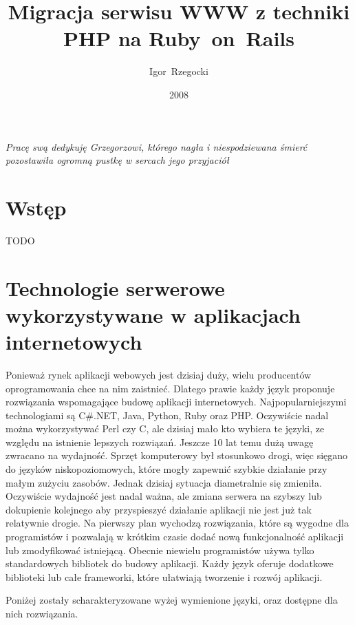 \documentclass[a4paper,12pt,oneside]{report}
\author{Igor~Rzegocki}
\title{Migracja serwisu WWW z techniki PHP na Ruby~on~Rails}
\date{2008}
\begin{document}
\maketitle

\thispagestyle{empty}
\begin{flushright}
\vspace*{13cm}
\emph{Pracę swą dedykuję Grzegorzowi, którego nagła i niespodziewana śmierć pozostawiła ogromną pustkę w sercach jego przyjaciół}
\end{flushright}


\tableofcontents

\chapter{Wstęp}
\label{cha:wstep}

TODO

\chapter[Technologie po stronie serwera]{Technologie serwerowe wykorzystywane w aplikacjach internetowych}
\label{cha:serwer}

Ponieważ rynek aplikacji webowych jest dzisiaj duży, wielu producentów oprogramowania chce na nim zaistnieć. Dlatego prawie każdy język proponuje rozwiązania wspomagające budowę aplikacji internetowych. Najpopularniejszymi technologiami są C\#.NET, Java, Python, Ruby oraz PHP. Oczywiście nadal można wykorzystywać Perl czy C, ale dzisiaj mało kto wybiera te języki, ze względu na istnienie lepszych rozwiązań. Jeszcze 10 lat temu dużą uwagę zwracano na wydajność. Sprzęt komputerowy był stosunkowo drogi, więc sięgano do języków niskopoziomowych, które mogły zapewnić szybkie działanie przy małym zużyciu zasobów. Jednak dzisiaj sytuacja diametralnie się zmieniła. Oczywiście wydajność jest nadal ważna, ale zmiana serwera na szybszy lub dokupienie kolejnego aby przyspieszyć działanie aplikacji nie jest już tak relatywnie drogie. Na pierwszy plan wychodzą rozwiązania, które są wygodne dla programistów i pozwalają w krótkim czasie dodać nową funkcjonalność aplikacji lub zmodyfikować istniejącą. Obecnie niewielu programistów używa tylko standardowych bibliotek do budowy aplikacji. Każdy język oferuje dodatkowe biblioteki lub całe frameworki, które ułatwiają tworzenie i rozwój aplikacji. 

Poniżej zostały scharakteryzowane wyżej wymienione języki, oraz dostępne dla nich rozwiązania.
\end{document}
